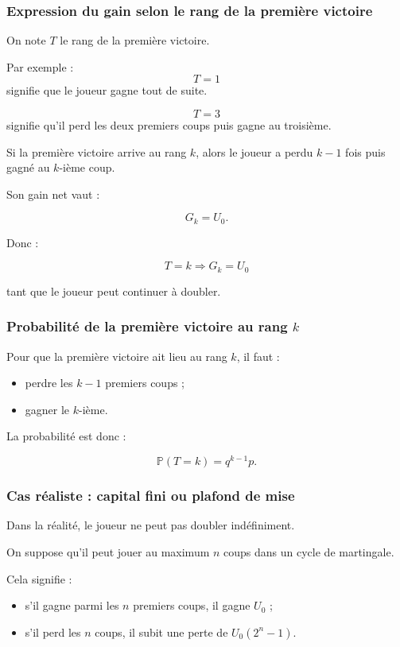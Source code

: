 \documentclass[11pt,a4paper]{article}
\begin{document}
\subsubsection*{Expression du gain selon le rang de la première victoire}

On note \(T\) le rang de la première victoire.

Par exemple :
\[
T=1
\]
signifie que le joueur gagne tout de suite.

\[
T=3
\]
signifie qu'il perd les deux premiers coups puis gagne au troisième.

Si la première victoire arrive au rang \(k\), alors le joueur a perdu \(k-1\) fois puis gagné au \(k\)-ième coup.

Son gain net vaut :

\[
G_k=U_0.
\]

Donc :

\[
\boxed{T=k \Longrightarrow G_k=U_0}
\]

tant que le joueur peut continuer à doubler.

\subsubsection*{Probabilité de la première victoire au rang \(k\)}

Pour que la première victoire ait lieu au rang \(k\), il faut :
\begin{itemize}
    \item perdre les \(k-1\) premiers coups ;
    \item gagner le \(k\)-ième.
\end{itemize}

La probabilité est donc :

\[
\mathbb{P}(T=k)=q^{k-1}p.
\]

\subsubsection*{Cas réaliste : capital fini ou plafond de mise}

Dans la réalité, le joueur ne peut pas doubler indéfiniment.

On suppose qu'il peut jouer au maximum \(n\) coups dans un cycle de martingale.

Cela signifie :
\begin{itemize}
    \item s'il gagne parmi les \(n\) premiers coups, il gagne \(U_0\) ;
    \item s'il perd les \(n\) coups, il subit une perte de \(U_0(2^n-1)\).
\end{itemize}
\end{document}
